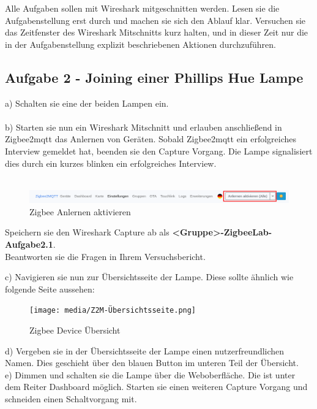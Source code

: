 \begin{Hinweis}
    Alle Aufgaben sollen mit Wireshark mitgeschnitten werden. Lesen sie die Aufgabenstellung erst durch und machen sie sich den Ablauf klar. Versuchen sie das 
    Zeitfenster des Wireshark Mitschnitts kurz halten, und in dieser Zeit nur die in der Aufgabenstellung explizit beschriebenen Aktionen durchzuführen.
\end{Hinweis}

\subsection{Aufgabe 2 - Joining einer Phillips Hue Lampe}
a) Schalten sie eine der beiden Lampen ein.\\\\
b) Starten sie nun ein Wireshark Mitschnitt und erlauben anschließend in Zigbee2mqtt das Anlernen von Geräten. Sobald Zigbee2mqtt ein erfolgreiches Interview gemeldet hat, 
beenden sie den Capture Vorgang. Die Lampe signalisiert dies durch ein kurzes blinken ein erfolgreiches Interview.\\\\

\begin{figure}[H]
    \centering
    \includegraphics[width=1\textwidth]{media/Z2M-Anlernen.png}
    \caption{Zigbee Anlernen aktivieren}
\end{figure}

\begin{Aufgabe}
    Speichern sie den Wireshark Capture ab als \textbf{\grqq <Gruppe>-ZigbeeLab-Aufgabe2.1\grqq{}}. \\
    Beantworten sie die Fragen in Ihrem Versuchsbericht.
\end{Aufgabe}

c) Navigieren sie nun zur Übersichtsseite der Lampe. Diese sollte ähnlich wie folgende Seite aussehen:

\begin{figure}[H]
    \centering
    \texttt{[image: media/Z2M-Übersichtsseite.png]}
    \caption{Zigbee Device Übersicht}
\end{figure}

d) Vergeben sie in der Übersichtsseite der Lampe einen nutzerfreundlichen Namen. Dies geschieht über den blauen Button im unteren Teil der Übersicht.\\
e) Dimmen und schalten sie die Lampe über die Weboberfläche. Die ist unter dem Reiter \grqq Dashboard\grqq{} möglich. Starten sie einen weiteren Capture Vorgang und
schneiden einen Schaltvorgang mit.

